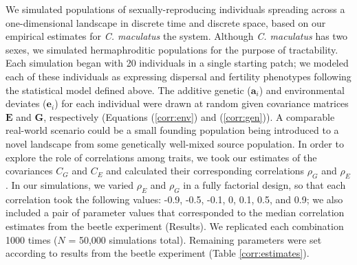 We simulated populations of sexually-reproducing individuals spreading across a one-dimensional landscape in discrete time and discrete space, based on our empirical estimates for \textit{C. maculatus} the system. Although \textit{C. maculatus} has two sexes, we simulated hermaphroditic populations for the purpose of tractability. Each simulation began with 20 individuals in a single starting patch; we modeled each of these individuals as expressing dispersal and fertility phenotypes following the statistical model defined above. The additive genetic ($\bm{a}_i$) and environmental deviates ($\bm{e}_i$) for each individual were drawn at random given covariance matrices $\bm{E}$ and $\bm{G}$, respectively (Equations (\ref{corr:env}) and (\ref{corr:gen})). A comparable real-world scenario could be a small founding population being introduced to a novel landscape from some genetically well-mixed source population. In order to explore the role of correlations among traits, we took our estimates of the covariances $C_{G}$ and $C_{E}$ and calculated their corresponding correlations $\rho_{G}$ and $\rho_{E}$ . In our simulations, we varied $\rho_{E}$ and $\rho_{G}$ in a fully factorial design, so that each correlation took the following values: -0.9, -0.5, -0.1, 0, 0.1, 0.5, and 0.9; we also included a pair of parameter values that corresponded to the median correlation estimates from the beetle experiment (Results). %
We replicated each combination 1000 times ($N$ = 50,000 simulations total). Remaining parameters were set according to results from the beetle experiment (Table \ref{corr:estimates}).

